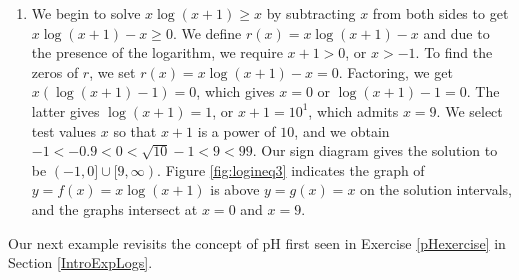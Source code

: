 {\begin{enumerate}
\item  We begin to solve $x \log(x+1) \geq x$ by subtracting $x$ from both sides to get $x \log(x+1)  - x \geq 0$.  We define $r(x) = x \log(x+1)  - x $ and due to the presence of the logarithm, we require $x+1 > 0$, or $x > -1$.  To find the zeros of $r$, we set $r(x) = x \log(x+1)  - x = 0$.  Factoring, we get $x \left(\log(x+1) - 1\right) = 0$, which gives $x=0$ or $\log(x+1) - 1=0$.  The latter gives $\log(x+1) = 1$, or $x+1 = 10^{1}$, which admits $x = 9$.  We select test values $x$ so that $x+1$ is a power of $10$, and we obtain $-1 < -0.9 < 0 < \sqrt{10} -1 < 9 < 99$.  Our sign diagram gives the solution to be $(-1,0] \cup [9, \infty)$. Figure \ref{fig:logineq3} indicates the graph of $y= f(x) = x \log(x+1)$ is above $y=g(x) = x$ on the solution intervals, and the graphs intersect at $x=0$ and $x=9$.


{}

\end{enumerate}
}

\medskip

Our next example revisits the concept of pH first seen in Exercise \ref{pHexercise} in Section \ref{IntroExpLogs}.  

\medskip

